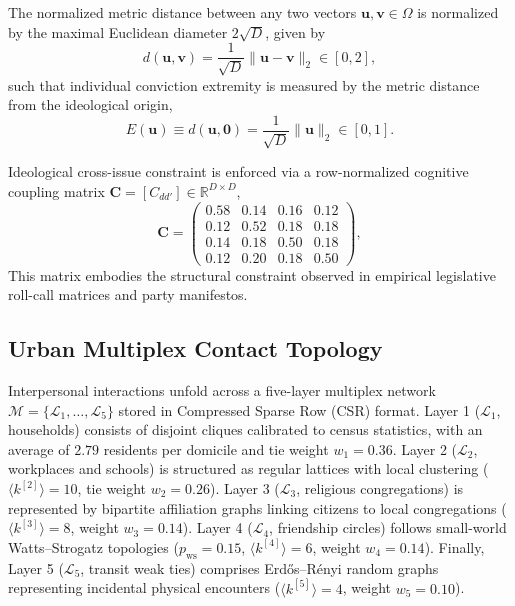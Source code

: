 \documentclass[a4paper,fleqn]{cas-dc}
\begin{document}
The normalized metric distance between any two vectors $\mathbf{u}, \mathbf{v} \in \Omega$ is normalized by the maximal Euclidean diameter $2\sqrt{D}$, given by
\begin{equation}
    d(\mathbf{u}, \mathbf{v}) = \frac{1}{\sqrt{D}} \|\mathbf{u} - \mathbf{v}\|_2 \in [0, 2],
    \label{eq:methods_distance}
\end{equation}
such that individual conviction extremity is measured by the metric distance from the ideological origin,
\begin{equation}
    E(\mathbf{u}) \equiv d(\mathbf{u}, \mathbf{0}) = \frac{1}{\sqrt{D}} \|\mathbf{u}\|_2 \in [0, 1].
    \label{eq:methods_extremity}
\end{equation}

Ideological cross-issue constraint is enforced via a row-normalized cognitive coupling matrix $\mathbf{C} = [C_{dd'}] \in \mathbb{R}^{D \times D}$,
\begin{equation}
    \mathbf{C} = \begin{pmatrix}
        0.58 & 0.14 & 0.16 & 0.12 \\
        0.12 & 0.52 & 0.18 & 0.18 \\
        0.14 & 0.18 & 0.50 & 0.18 \\
        0.12 & 0.20 & 0.18 & 0.50
    \end{pmatrix},
    \label{eq:coupling_matrix}
\end{equation}
This matrix embodies the structural constraint observed in empirical legislative roll-call matrices and party manifestos.

\subsection{Urban Multiplex Contact Topology}
\label{subsec:multiplex_network}
Interpersonal interactions unfold across a five-layer multiplex network $\mathcal{M} = \{\mathcal{L}_1, \dots, \mathcal{L}_5\}$ stored in Compressed Sparse Row (CSR) format. Layer 1 ($\mathcal{L}_1$, households) consists of disjoint cliques calibrated to census statistics, with an average of $2.79$ residents per domicile and tie weight $w_1 = 0.36$. Layer 2 ($\mathcal{L}_2$, workplaces and schools) is structured as regular lattices with local clustering ($\langle k^{[2]} \rangle = 10$, tie weight $w_2 = 0.26$). Layer 3 ($\mathcal{L}_3$, religious congregations) is represented by bipartite affiliation graphs linking citizens to local congregations ($\langle k^{[3]} \rangle = 8$, weight $w_3 = 0.14$). Layer 4 ($\mathcal{L}_4$, friendship circles) follows small-world Watts--Strogatz topologies ($p_{\mathrm{ws}} = 0.15$, $\langle k^{[4]} \rangle = 6$, weight $w_4 = 0.14$). Finally, Layer 5 ($\mathcal{L}_5$, transit weak ties) comprises Erd\H{o}s--R\'enyi random graphs representing incidental physical encounters ($\langle k^{[5]} \rangle = 4$, weight $w_5 = 0.10$).
\end{document}
